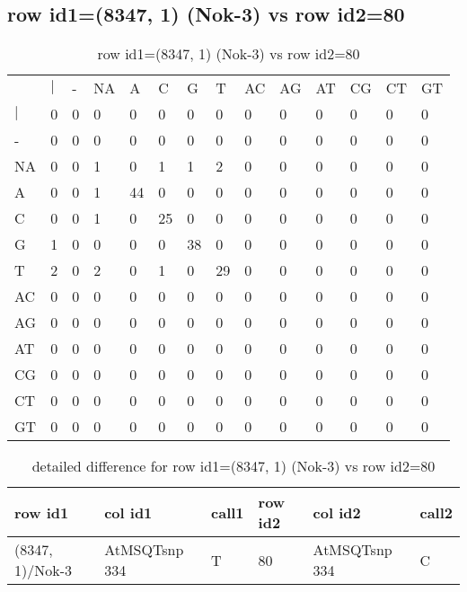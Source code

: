 \subsection{row id1=(8347, 1) (Nok-3) vs row id2=80}
\begin{center}
\begin{longtable}{|l|l|l|l|l|l|l|l|l|l|l|l|l|l|}
\caption{row id1=(8347, 1) (Nok-3) vs row id2=80} \label{table_dm556}\\
\hline
\\
\hline
&$|$&-&NA&A&C&G&T&AC&AG&AT&CG&CT&GT\\
$|$&0&0&0&0&0&0&0&0&0&0&0&0&0\\
-&0&0&0&0&0&0&0&0&0&0&0&0&0\\
NA&0&0&1&0&1&1&2&0&0&0&0&0&0\\
A&0&0&1&44&0&0&0&0&0&0&0&0&0\\
C&0&0&1&0&25&0&0&0&0&0&0&0&0\\
G&1&0&0&0&0&38&0&0&0&0&0&0&0\\
T&2&0&2&0&1&0&29&0&0&0&0&0&0\\
AC&0&0&0&0&0&0&0&0&0&0&0&0&0\\
AG&0&0&0&0&0&0&0&0&0&0&0&0&0\\
AT&0&0&0&0&0&0&0&0&0&0&0&0&0\\
CG&0&0&0&0&0&0&0&0&0&0&0&0&0\\
CT&0&0&0&0&0&0&0&0&0&0&0&0&0\\
GT&0&0&0&0&0&0&0&0&0&0&0&0&0\\
\hline
\end{longtable}
\end{center}

\begin{center}
\begin{longtable}{|l|l|l|l|l|l|}
\caption{detailed difference for row id1=(8347, 1) (Nok-3) vs row id2=80} \label{table_dm557}\\
\hline
row id1&col id1&call1&row id2&col id2&call2\\
\hline
(8347, 1)/Nok-3&AtMSQTsnp 334&T&80&AtMSQTsnp 334&C\\
\hline
\end{longtable}
\end{center}

